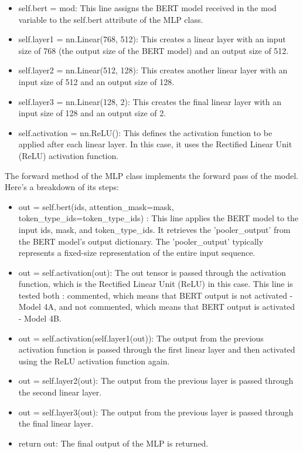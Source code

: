 \begin{itemize}
    \item self.bert = mod: This line assigns the BERT model received in the mod variable to the self.bert attribute of the MLP class.

    \item self.layer1 = nn.Linear(768, 512): This creates a linear layer with an input size of 768 (the output size of the BERT model) and an output size of 512.

    \item self.layer2 = nn.Linear(512, 128): This creates another linear layer with an input size of 512 and an output size of 128.

    \item self.layer3 = nn.Linear(128, 2): This creates the final linear layer with an input size of 128 and an output size of 2.

    \item self.activation = nn.ReLU(): This defines the activation function to be applied after each linear layer. In this case, it uses the Rectified Linear Unit (ReLU) activation function.
\end{itemize}

The forward method of the MLP class implements the forward pass of the model. Here's a breakdown of its steps:

\begin{itemize}
    \item out = self.bert(ids, attention\_mask=mask, token\_type\_ids=token\_type\_ids) : This line applies the BERT model to the input ids, mask, and token\_type\_ids. It retrieves the 'pooler\_output' from the BERT model's output dictionary. The 'pooler\_output' typically represents a fixed-size representation of the entire input sequence.

    \item out = self.activation(out): The out tensor is passed through the activation function, which is the Rectified Linear Unit (ReLU) in this case. This line is tested both : commented, which means that BERT output is not activated - Model 4A, and not commented, which means that BERT output is activated - Model 4B.

    \item out = self.activation(self.layer1(out)): The output from the previous activation function is passed through the first linear layer and then activated using the ReLU activation function again.

    \item out = self.layer2(out): The output from the previous layer is passed through the second linear layer.

    \item out = self.layer3(out): The output from the previous layer is passed through the final linear layer.

    \item return out: The final output of the MLP is returned.
\end{itemize}

